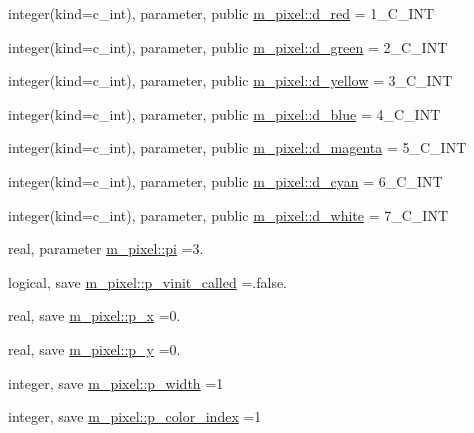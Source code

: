 \begin{DoxyCompactItemize}
\item 
integer(kind=c\+\_\+int), parameter, public \mbox{\hyperlink{namespacem__pixel_a79a9da737aa4362052e625bf692e4426}{m\+\_\+pixel\+::d\+\_\+red}} = 1\+\_\+\+C\+\_\+\+I\+NT
\item 
integer(kind=c\+\_\+int), parameter, public \mbox{\hyperlink{namespacem__pixel_a7826b243f01d8a4b6a8376a71ff0aab0}{m\+\_\+pixel\+::d\+\_\+green}} = 2\+\_\+\+C\+\_\+\+I\+NT
\item 
integer(kind=c\+\_\+int), parameter, public \mbox{\hyperlink{namespacem__pixel_ac67e6b5e1f5dfb58a70f4f63fd92a5b7}{m\+\_\+pixel\+::d\+\_\+yellow}} = 3\+\_\+\+C\+\_\+\+I\+NT
\item 
integer(kind=c\+\_\+int), parameter, public \mbox{\hyperlink{namespacem__pixel_af2a1f35244e511380fe83cc31ceb31a8}{m\+\_\+pixel\+::d\+\_\+blue}} = 4\+\_\+\+C\+\_\+\+I\+NT
\item 
integer(kind=c\+\_\+int), parameter, public \mbox{\hyperlink{namespacem__pixel_a499c4e58df4136e662c8e15de6ba0b3b}{m\+\_\+pixel\+::d\+\_\+magenta}} = 5\+\_\+\+C\+\_\+\+I\+NT
\item 
integer(kind=c\+\_\+int), parameter, public \mbox{\hyperlink{namespacem__pixel_ae515f0991ef77d85371b85c6fdb2a67f}{m\+\_\+pixel\+::d\+\_\+cyan}} = 6\+\_\+\+C\+\_\+\+I\+NT
\item 
integer(kind=c\+\_\+int), parameter, public \mbox{\hyperlink{namespacem__pixel_accffd1d4aa8ce679a6049855ea7ab29c}{m\+\_\+pixel\+::d\+\_\+white}} = 7\+\_\+\+C\+\_\+\+I\+NT
\item 
real, parameter \mbox{\hyperlink{namespacem__pixel_a2ff737e84d07f927bac2deb1801428a2}{m\+\_\+pixel\+::pi}} =3.
\item 
logical, save \mbox{\hyperlink{namespacem__pixel_a5205a23825feacbc005215adc889a710}{m\+\_\+pixel\+::p\+\_\+vinit\+\_\+called}} =.false.
\item 
real, save \mbox{\hyperlink{namespacem__pixel_a983dc4bc4ea45266ee8b5100367bedee}{m\+\_\+pixel\+::p\+\_\+x}} =0.
\item 
real, save \mbox{\hyperlink{namespacem__pixel_a8bda60db9b6c7c2402e1e12a44bc36aa}{m\+\_\+pixel\+::p\+\_\+y}} =0.
\item 
integer, save \mbox{\hyperlink{namespacem__pixel_a0ccc9f9102afdf3b469b3d2cab22aec9}{m\+\_\+pixel\+::p\+\_\+width}} =1
\item 
integer, save \mbox{\hyperlink{namespacem__pixel_af37b7b3481f3876270e99200e2554b9f}{m\+\_\+pixel\+::p\+\_\+color\+\_\+index}} =1
\item 

\end{DoxyCompactItemize}
